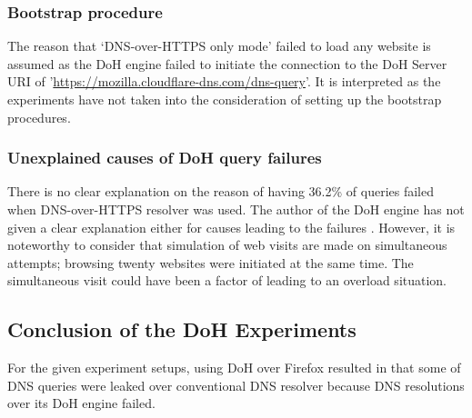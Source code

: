 \subsubsection{Bootstrap procedure}\label{bootstrap}
The reason that `DNS-over-HTTPS only mode' failed to load any website is assumed as the DoH engine failed to initiate the connection to the DoH Server URI of '\url{https://mozilla.cloudflare-dns.com/dns-query}'. It is interpreted as the experiments have not taken into the consideration of setting up the bootstrap procedures.

\subsubsection{Unexplained causes of DoH query failures}
There is no clear explanation on the reason of having 36.2\% of queries failed when DNS-over-HTTPS resolver was used.
The author of the DoH engine has not given a clear explanation either for causes leading to the failures \cite{daniel-doh}.
However, it is noteworthy to consider that simulation of web visits are made on simultaneous attempts; browsing twenty websites were initiated at the same time.
The simultaneous visit could have been a factor of leading to an overload situation.

\subsection{Conclusion of the DoH Experiments}
For the given experiment setups, using DoH over Firefox resulted in that some of DNS queries were leaked over conventional DNS resolver because DNS resolutions over its DoH engine failed.